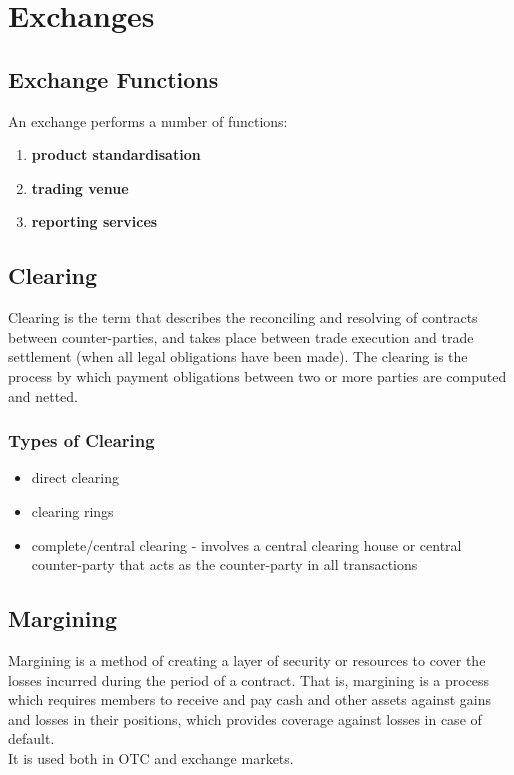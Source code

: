 \chapter{Exchanges}

\section{Exchange Functions}
An exchange performs a number of functions:
\begin{enumerate}
	\item \textbf{\color{blue}product standardisation}
	\item \textbf{\color{blue}trading venue}
	\item \textbf{\color{blue}reporting services}
\end{enumerate}


\section{Clearing}
Clearing is the term that describes the reconciling and resolving of contracts between counter-parties, and takes place between trade execution and trade settlement (when all legal obligations have been made).
The clearing is the process by which payment obligations between two or more parties are computed and netted.

\subsection{Types of Clearing}
\begin{itemize}
	\item direct clearing
	\item clearing rings
	\item complete/central clearing - involves a central clearing house or central counter-party that acts as the counter-party in all transactions
\end{itemize}


\section{Margining}
Margining is a method of creating a layer of security or resources to cover the losses incurred during the period of a contract. That is, margining is a process which requires members to receive and pay cash and other assets against gains and losses in their positions, which provides coverage against losses in case of default.\\
It is used both in OTC and exchange markets.

